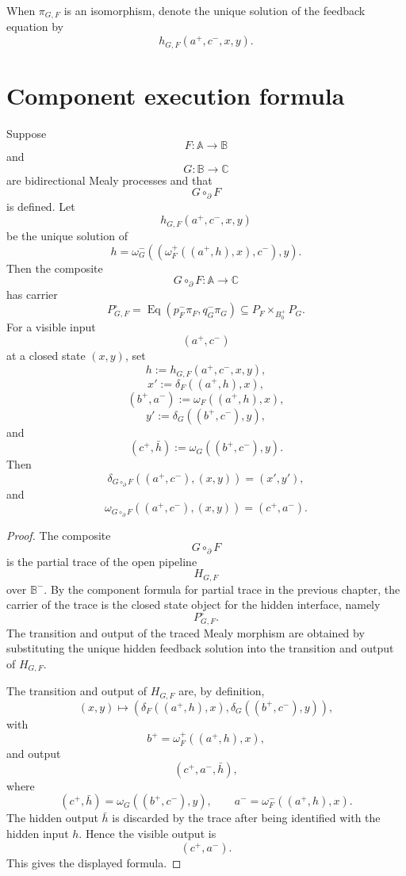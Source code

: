 When \(\pi_{G,F}\) is an isomorphism, denote the unique solution of the
feedback equation by
\[
h_{G,F}(a^+,c^-,x,y).
\]

\section{Component execution formula}
\label{sec:component-execution-formula}

\begin{theorem}
\label{thm:component-execution-formula}
Suppose
\[
F:\mathbb A\to\mathbb B
\]
and
\[
G:\mathbb B\to\mathbb C
\]
are bidirectional Mealy processes and that
\[
G\circ_{\partial}F
\]
is defined.  Let
\[
h_{G,F}(a^+,c^-,x,y)
\]
be the unique solution of
\[
h
=
\omega_G^-
\left(
\left(
\omega_F^+((a^+,h),x),
c^-
\right),
y
\right).
\]
Then the composite
\[
G\circ_{\partial}F:\mathbb A\to\mathbb C
\]
has carrier
\[
P_{G,F}^{\circ}
=
\operatorname{Eq}(p_F^-\pi_F,q_G^-\pi_G)
\subseteq
P_F\times_{B_0^+}P_G.
\]
For a visible input
\[
(a^+,c^-)
\]
at a closed state \((x,y)\), set
\[
h:=h_{G,F}(a^+,c^-,x,y),
\]
\[
x':=\delta_F((a^+,h),x),
\]
\[
(b^+,a^-):=\omega_F((a^+,h),x),
\]
\[
y':=\delta_G((b^+,c^-),y),
\]
and
\[
(c^+,\bar h):=\omega_G((b^+,c^-),y).
\]
Then
\[
\delta_{G\circ_{\partial}F}((a^+,c^-),(x,y))
=
(x',y'),
\]
and
\[
\omega_{G\circ_{\partial}F}((a^+,c^-),(x,y))
=
(c^+,a^-).
\]
\end{theorem}

\begin{proof}
The composite
\[
G\circ_{\partial}F
\]
is the partial trace of the open pipeline
\[
H_{G,F}
\]
over \(\mathbb B^-\).  By the component formula for partial trace in the
previous chapter, the carrier of the trace is the closed state object for the
hidden interface, namely
\[
P_{G,F}^{\circ}.
\]
The transition and output of the traced Mealy morphism are obtained by
substituting the unique hidden feedback solution into the transition and
output of \(H_{G,F}\).

The transition and output of \(H_{G,F}\) are, by definition,
\[
(x,y)
\longmapsto
\left(
\delta_F((a^+,h),x),
\delta_G((b^+,c^-),y)
\right),
\]
with
\[
b^+=\omega_F^+((a^+,h),x),
\]
and output
\[
(c^+,a^-,\bar h),
\]
where
\[
(c^+,\bar h)=\omega_G((b^+,c^-),y),
\qquad
a^-=\omega_F^-((a^+,h),x).
\]
The hidden output \(\bar h\) is discarded by the trace after being identified
with the hidden input \(h\).  Hence the visible output is
\[
(c^+,a^-).
\]
This gives the displayed formula.
\end{proof}

